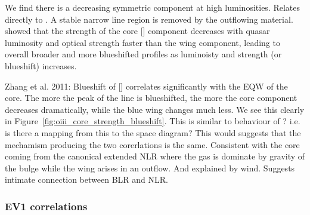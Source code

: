 We find there is a decreasing symmetric component at high luminosities. 
Relates directly to \citet{shen14}. 
A stable narrow line region is removed by the outflowing material. 
\citet{shen14} showed that the strength of the core [] component decreases with quasar luminosity and optical  strength faster than the wing component, leading to overall broader and more blueshifted profiles as luminoisty and  strength (or  blueshift) increases. 

Zhang et al. 2011: Blueshift of [] correlates significantly with the EQW of the core. 
The more the peak of the line is blueshifted, the more the core component decreases dramatically, while the blue wing changes much less. 
We see this clearly in Figure~\ref{fig:oiii_core_strength_blueshift}. 
This is similar to behaviour of ? i.e. is there a mapping from this to the  space diagram? This would suggests that the mechamism producing the two corerlations is the same. 
Consistent with the core coming from the canonical extended NLR where the gas is dominate by gravity of the bulge while the wing arises in an outflow. 
And  explained by wind. Suggests intimate connection between BLR and NLR.

\subsubsection{EV1 correlations}

